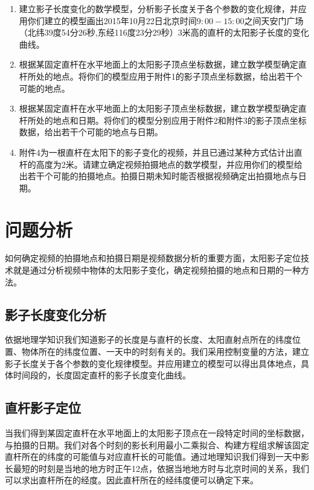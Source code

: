 \documentclass[withoutpreface,bwprint]{cumcmthesis} %
\begin{document}
\begin{enumerate}
	\item 建立影子长度变化的数学模型，分析影子长度关于各个参数的变化规律，并应用你们建立的模型画出2015年10月22日北京时间$9:00-15:00$之间天安门广场（北纬39度54分26秒,东经116度23分29秒）3米高的直杆的太阳影子长度的变化曲线。
	\item 根据某固定直杆在水平地面上的太阳影子顶点坐标数据，建立数学模型确定直杆所处的地点。将你们的模型应用于附件1的影子顶点坐标数据，给出若干个可能的地点。
	\item  根据某固定直杆在水平地面上的太阳影子顶点坐标数据，建立数学模型确定直杆所处的地点和日期。将你们的模型分别应用于附件2和附件3的影子顶点坐标数据，给出若干个可能的地点与日期。
	\item 附件4为一根直杆在太阳下的影子变化的视频，并且已通过某种方式估计出直杆的高度为2米。请建立确定视频拍摄地点的数学模型，并应用你们的模型给出若干个可能的拍摄地点。拍摄日期未知时能否根据视频确定出拍摄地点与日期。
\end{enumerate}

\section{问题分析}

\par 如何确定视频的拍摄地点和拍摄日期是视频数据分析的重要方面，太阳影子定位技术就是通过分析视频中物体的太阳影子变化，确定视频拍摄的地点和日期的一种方法。
\subsection{影子长度变化分析}

\par 依据地理学知识我们知道影子的长度是与直杆的长度、太阳直射点所在的纬度位置、物体所在的纬度位置、一天中的时刻有关的。我们采用控制变量的方法，建立影子长度关于各个参数的变化规律模型。并应用建立的模型可以得出具体地点，具体时间段的，长度固定直杆的影子长度变化曲线。

\subsection{直杆影子定位}

\par 当我们得到某固定直杆在水平地面上的太阳影子顶点在一段特定时间的坐标数据，与拍摄的日期。我们对各个时刻的影长利用最小二乘拟合、构建方程组求解该固定直杆所在的纬度的可能值与对应直杆长的可能值。通过地理知识我们得到一天中影长最短的时刻是当地的地方时正午12点，依据当地地方时与北京时间的关系，我们可以求出直杆所在的经度。因此直杆所在的经纬度便可以确定下来。
\end{document}
